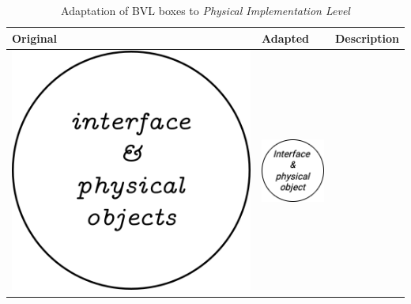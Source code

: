 \begin{longtable}{|m{}|m{}|m{}|}
    \caption{Adaptation of BVL boxes to \textit{Physical Implementation Level}} \label{tab:c4-bvl_physical} \\
    \hline
    \textbf{Original} & \textbf{Adapted} & \textbf{Description} \\
    \hline
    \centering
    \includegraphics[width=0.75\linewidth]{chapters/4-MDC_model_application/image/bvl-interface-o.png}
    &
    \centering
    \includegraphics[width=0.75\linewidth]{chapters/4-MDC_model_application/image/bvl-interface.png}

\end{longtable}
